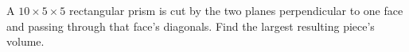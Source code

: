A $ 10\times5\times5 $ rectangular prism is cut by the two planes perpendicular to one face and passing through that face's diagonals. Find the largest resulting piece's volume.
